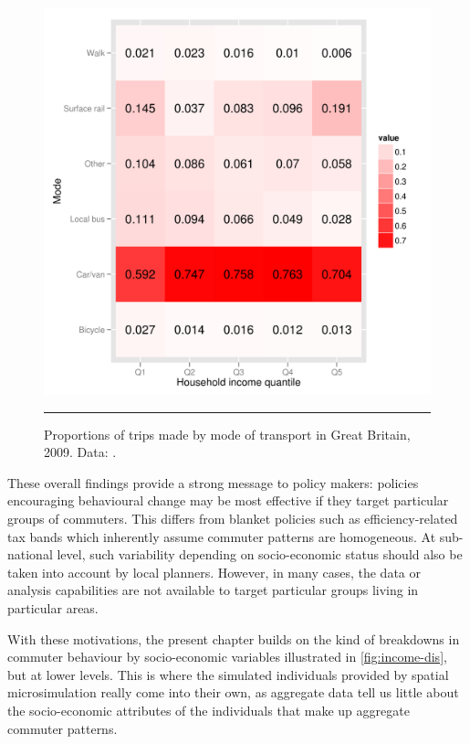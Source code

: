 \begin{figure}[htbp]
  \centerline{
    \includegraphics[width = 14 cm]{./Figures/income-heatmap}}
    \rule{35em}{0.5pt}
  \caption[Heatmap of mode of travel by income group]{Proportions
of trips made by mode of transport in Great Britain, 2009.
Data: \citep[Table 6]{DfT2011-commuting}.}
  \label{income-heatmap}
\end{figure}

These overall findings provide a strong message to policy makers:
policies encouraging behavioural change may be most effective
if they target particular groups of commuters.
This differs from blanket policies such as efficiency-related
tax bands which inherently assume commuter patterns are homogeneous.
At sub-national level, such variability depending on socio-economic
status should also be taken into account by local planners.
However, in many cases, the data or analysis capabilities are
not available to target particular groups living in particular areas.

With these motivations, the present chapter builds on the kind of breakdowns in
commuter behaviour
by socio-economic variables illustrated in \cref{fig:income-dis}, but
at lower levels. This is where the simulated individuals provided by
spatial microsimulation really come into their own, as aggregate data tell
us little about the socio-economic attributes of the individuals
that make up aggregate commuter patterns.

